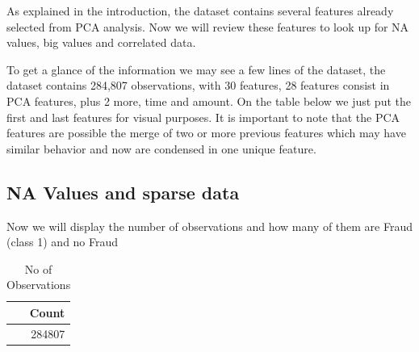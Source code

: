 \documentclass[
]{article}
\begin{document}
As explained in the introduction, the dataset contains several features
already selected from PCA analysis. Now we will review these features to
look up for NA values, big values and correlated data.

To get a glance of the information we may see a few lines of the
dataset, the dataset contains 284,807 observations, with 30 features, 28
features consist in PCA features, plus 2 more, time and amount. On the
table below we just put the first and last features for visual purposes.
It is important to note that the PCA features are possible the merge of
two or more previous features which may have similar behavior and now
are condensed in one unique feature.

\begin{table}[!h]

\caption{\label{tab:check_first_lines}First six rows of the fraud dataset}
\centering
{}
\end{table}

\hypertarget{na-values-and-sparse-data}{%
\subsection{NA Values and sparse data}\label{na-values-and-sparse-data}}

Now we will display the number of observations and how many of them are
Fraud (class 1) and no Fraud

\begin{table}[!h]

\caption{\label{tab:no_obs}No of Observations}
\centering
\fontsize{10}{12}\selectfont
\begin{tabular}[t]{r}
\toprule
Count\\
\midrule
284807\\
\bottomrule
\end{tabular}
\end{table}
\end{document}
